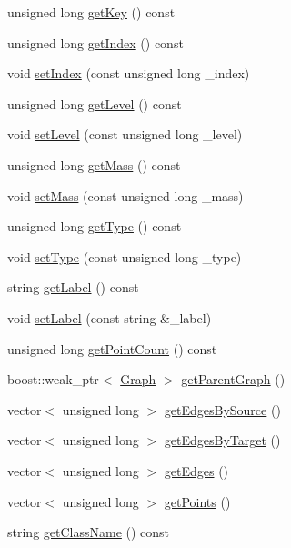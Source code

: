 \begin{DoxyCompactItemize}
\item 
unsigned long \hyperlink{class_node_ad29c618ac085b5f1fd18b56fc7da3b6f}{get\+Key} () const 
\item 
unsigned long \hyperlink{class_node_ab8dbb56eb81a714393f0eebdb4f118ea}{get\+Index} () const 
\item 
void \hyperlink{class_node_ae1b4b6d3eeabc36b033399b915f50237}{set\+Index} (const unsigned long \+\_\+index)
\item 
unsigned long \hyperlink{class_node_ad2d6c384c4e0745ef4284e167266eff1}{get\+Level} () const 
\item 
void \hyperlink{class_node_a35b70eabbf5333758d9478ca4e78b04b}{set\+Level} (const unsigned long \+\_\+level)
\item 
unsigned long \hyperlink{class_node_a75b12c59a86414324fe4ce0c3a85c285}{get\+Mass} () const 
\item 
void \hyperlink{class_node_aca9eb6298d46819aa0eb1863de0c821a}{set\+Mass} (const unsigned long \+\_\+mass)
\item 
unsigned long \hyperlink{class_node_a2fae3f1c83599121e0620af94005d9b6}{get\+Type} () const 
\item 
void \hyperlink{class_node_a2f153b0665cc8879032c5b7ed85840d3}{set\+Type} (const unsigned long \+\_\+type)
\item 
string \hyperlink{class_node_aba4325ee85f720ec32758bc1a3c95171}{get\+Label} () const 
\item 
void \hyperlink{class_node_aa32ad30f15f0bbde45ff7d7656414a91}{set\+Label} (const string \&\+\_\+label)
\item 
unsigned long \hyperlink{class_node_adf9c592e667b9f01a7c10bd12e8fbcf7}{get\+Point\+Count} () const 
\item 
boost\+::weak\+\_\+ptr$<$ \hyperlink{class_graph}{Graph} $>$ \hyperlink{class_node_a4ad64b738100a89983c9f8910afa1f65}{get\+Parent\+Graph} ()
\item 
vector$<$ unsigned long $>$ \hyperlink{class_node_ade5177c361416750523d17354a10b15c}{get\+Edges\+By\+Source} ()
\item 
vector$<$ unsigned long $>$ \hyperlink{class_node_a2ecad24e8b055c812f4f1858571f9a92}{get\+Edges\+By\+Target} ()
\item 
vector$<$ unsigned long $>$ \hyperlink{class_node_a064c75c67edf37242b95351a4118f8e7}{get\+Edges} ()
\item 
vector$<$ unsigned long $>$ \hyperlink{class_node_a6c2307b59946d25c775d56e4a5c233b9}{get\+Points} ()
\item 
string \hyperlink{class_node_ad38172d58cca788a6f57a16903c83d4e}{get\+Class\+Name} () const 
\end{DoxyCompactItemize}
